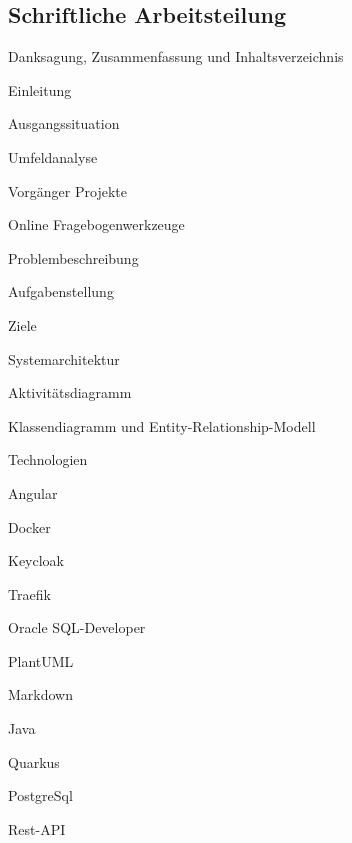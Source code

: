 \subsection{Schriftliche Arbeitsteilung}
\begin{compactenum}
    \item Danksagung, Zusammenfassung und Inhaltsverzeichnis \big [ R \big ]
    \item Einleitung \big [ R \& W \big ]
    \item Ausgangssituation \big [ W \big ]
    \item Umfeldanalyse \big [ R \big ]
    \begin{compactenum}
        \item Vorgänger Projekte \big [ R \big ]
        \item Online Fragebogenwerkzeuge \big [ R \big ]
    \end{compactenum}
    \item Problembeschreibung \big [ W \big ]
    \item Aufgabenstellung \big [ W \big ]
    \item Ziele \big [ R \& W \big ]
    \item Systemarchitektur \big [ R \& W \big ]
    \item \begin{compactenum}
        \item Aktivitätsdiagramm \big [ W \big ]
        \item Klassendiagramm und Entity-Relationship-Modell \big [ R \big ]
    \end{compactenum}
    \item Technologien \big [ R \& W \big ]
    \begin{compactenum}
        \item Angular \big [ R \big ]
        \item Docker \big [ R \big ]
        \item Keycloak \big [ R \big ]
        \item Traefik \big [ R \big ]
        \item Oracle SQL-Developer \big [ R \big ]
        \item PlantUML \big [ R \big ]
        \item Markdown \big [ R \big ]
        \item Java \big [ W \big ]
        \item Quarkus \big [ W \big ]
        \item PostgreSql \big [ W \big ]
        \item Rest-API \big [ W \big ]

\end{compactenum}
\end{compactenum}
